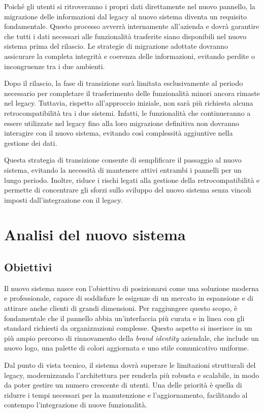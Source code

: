 Poiché gli utenti si ritroveranno i propri dati direttamente nel nuovo pannello, la migrazione delle informazioni dal legacy al nuovo sistema diventa un requisito fondamentale. Questo processo avverrà internamente all’azienda e dovrà garantire che tutti i dati necessari alle funzionalità trasferite siano disponibili nel nuovo sistema prima del rilascio. Le strategie di migrazione adottate dovranno assicurare la completa integrità e coerenza delle informazioni, evitando perdite o incongruenze tra i due ambienti.

Dopo il rilascio, la fase di transizione sarà limitata esclusivamente al periodo necessario per completare il trasferimento delle funzionalità minori ancora rimaste nel legacy. Tuttavia, rispetto all'approccio iniziale, non sarà più richiesta alcuna retrocompatibilità tra i due sistemi. Infatti, le funzionalità che continueranno a essere utilizzate nel legacy fino alla loro migrazione definitiva non dovranno interagire con il nuovo sistema, evitando così complessità aggiuntive nella gestione dei dati.

Questa strategia di transizione consente di semplificare il passaggio al nuovo sistema, evitando la necessità di mantenere attivi entrambi i pannelli per un lungo periodo. Inoltre, riduce i rischi legati alla gestione della retrocompatibilità e permette di concentrare gli sforzi sullo sviluppo del nuovo sistema senza vincoli imposti dall’integrazione con il legacy.

\section{Analisi del nuovo sistema}
\subsection{Obiettivi}
Il nuovo sistema nasce con l'obiettivo di posizionarsi come una soluzione moderna e professionale, capace di soddisfare le esigenze di un mercato in espansione e di attirare anche clienti di grandi dimensioni. Per raggiungere questo scopo, è fondamentale che il pannello abbia un'interfaccia più curata e in linea con gli standard richiesti da organizzazioni complesse. Questo aspetto si inserisce in un più ampio percorso di rinnovamento della \textit{brand identity} aziendale, che include un nuovo logo, una palette di colori aggiornata e uno stile comunicativo uniforme.

Dal punto di vista tecnico, il sistema dovrà superare le limitazioni strutturali del legacy, modernizzando l'architettura per renderla più robusta e scalabile, in modo da poter gestire un numero crescente di utenti. Una delle priorità è quella di ridurre i tempi necessari per la manutenzione e l’aggiornamento, facilitando al contempo l’integrazione di nuove funzionalità.

